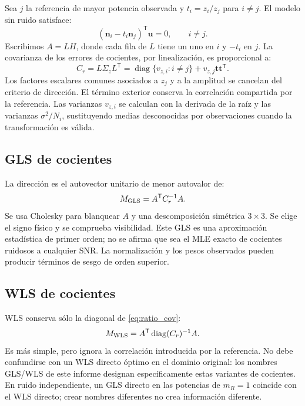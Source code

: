 \documentclass[11pt,a4paper]{article}
\begin{document}
Sea $j$ la referencia de mayor potencia observada y $t_i=z_i/z_j$ para $i\ne j$. El modelo sin ruido satisface:
\begin{equation}
 (\mathbf n_i-t_i\mathbf n_j)^{\mathsf T}\mathbf u=0,\qquad i\ne j.
\end{equation}
Escribimos $A=LH$, donde cada fila de $L$ tiene un uno en $i$ y $-t_i$ en $j$. La covarianza de los errores de cocientes, por linealización, es proporcional a:
\begin{equation}
 C_r=L\Sigma_zL^{\mathsf T}
 =\operatorname{diag}\{v_{z,i}:i\ne j\}+v_{z,j}\mathbf t\mathbf t^{\mathsf T}.
\label{eq:ratio_cov}
\end{equation}
Los factores escalares comunes asociados a $z_j$ y a la amplitud se cancelan del criterio de dirección. El término exterior conserva la correlación compartida por la referencia. Las varianzas $v_{z,i}$ se calculan con la derivada de la raíz y las varianzas $\sigma^2/N_i$, sustituyendo medias desconocidas por observaciones cuando la transformación es válida.

\subsection{GLS de cocientes}
La dirección es el autovector unitario de menor autovalor de:
\begin{equation}
 M_{\rm GLS}=A^{\mathsf T}C_r^{-1}A.
\end{equation}
Se usa Cholesky para blanquear $A$ y una descomposición simétrica $3\times3$. Se elige el signo físico y se comprueba visibilidad. Este GLS es una aproximación estadística de primer orden; no se afirma que sea el MLE exacto de cocientes ruidosos a cualquier SNR. La normalización y los pesos observados pueden producir términos de sesgo de orden superior.

\subsection{WLS de cocientes}
WLS conserva sólo la diagonal de \eqref{eq:ratio_cov}:
\begin{equation}
 M_{\rm WLS}=A^{\mathsf T}\operatorname{diag}(C_r)^{-1}A.
\end{equation}
Es más simple, pero ignora la correlación introducida por la referencia. No debe confundirse con un WLS directo óptimo en el dominio original: los nombres GLS/WLS de este informe designan específicamente estas variantes de cocientes. En ruido independiente, un GLS directo en las potencias de $m_R=1$ coincide con el WLS directo; crear nombres diferentes no crea información diferente.
\end{document}
